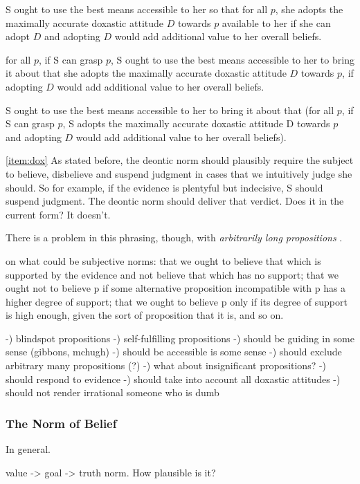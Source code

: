 \documentclass[12pt,numbers=noenddot]{scrartcl}
\begin{document}
S ought to use the best means accessible to her so that for all $p$, she adopts the maximally accurate doxastic attitude $D$ towards $p$ available to her if she can adopt $D$ and adopting $D$ would add additional value to her overall beliefs.

for all $p$, if S can grasp $p$, S ought to use the best means accessible to her to bring it about that she adopts the maximally accurate doxastic attitude $D$ towards $p$, if adopting $D$ would add additional value to her overall beliefs.

S ought to use the best means accessible to her to bring it about that (for all $p$, if S can grasp $p$, S adopts the maximally accurate doxastic attitude D towards $p$ and adopting $D$ would add additional value to her overall beliefs).

\ref{item:dox} As stated before, the deontic norm should plausibly require the subject to believe, disbelieve and suspend judgment in cases that we intuitively judge she should. So for example, if the evidence is plentyful but indecisive, S should suspend judgment. The deontic norm should deliver that verdict. Does it in the current form? It doesn't.

There is a problem in this phrasing, though, with \emph{arbitrarily long propositions} \autocite[]{Greenberg2016-GREITN}.

\textcite[39]{Boghossian2003-BOGTNO} on what could be subjective norms: that we ought to believe that which is supported by the evidence and not believe that which has no support; that we ought not to believe p if some alternative proposition incompatible with p has a higher degree of support; that we ought to believe p only if its degree of support is high enough, given the sort of proposition that it is, and so on. 

-) blindspot propositions
-) self-fulfilling propositions
-) should be guiding in some sense (gibbons, mchugh)
-) should be accessible is some sense
-) should exclude arbitrary many propositions (?)
-) what about insignificant propositions?
-) should respond to evidence
-) should take into account all doxastic attitudes
-) should not render irrational someone who is dumb

\subsubsection{The Norm of Belief}

In general. 

value -> goal -> truth norm. How plausible is it?
\end{document}

